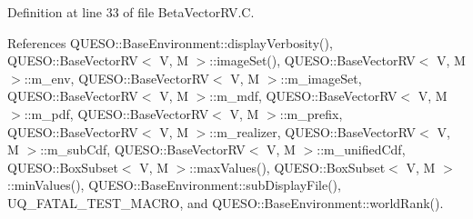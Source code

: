 Definition at line 33 of file Beta\-Vector\-R\-V.\-C.



References Q\-U\-E\-S\-O\-::\-Base\-Environment\-::display\-Verbosity(), Q\-U\-E\-S\-O\-::\-Base\-Vector\-R\-V$<$ V, M $>$\-::image\-Set(), Q\-U\-E\-S\-O\-::\-Base\-Vector\-R\-V$<$ V, M $>$\-::m\-\_\-env, Q\-U\-E\-S\-O\-::\-Base\-Vector\-R\-V$<$ V, M $>$\-::m\-\_\-image\-Set, Q\-U\-E\-S\-O\-::\-Base\-Vector\-R\-V$<$ V, M $>$\-::m\-\_\-mdf, Q\-U\-E\-S\-O\-::\-Base\-Vector\-R\-V$<$ V, M $>$\-::m\-\_\-pdf, Q\-U\-E\-S\-O\-::\-Base\-Vector\-R\-V$<$ V, M $>$\-::m\-\_\-prefix, Q\-U\-E\-S\-O\-::\-Base\-Vector\-R\-V$<$ V, M $>$\-::m\-\_\-realizer, Q\-U\-E\-S\-O\-::\-Base\-Vector\-R\-V$<$ V, M $>$\-::m\-\_\-sub\-Cdf, Q\-U\-E\-S\-O\-::\-Base\-Vector\-R\-V$<$ V, M $>$\-::m\-\_\-unified\-Cdf, Q\-U\-E\-S\-O\-::\-Box\-Subset$<$ V, M $>$\-::max\-Values(), Q\-U\-E\-S\-O\-::\-Box\-Subset$<$ V, M $>$\-::min\-Values(), Q\-U\-E\-S\-O\-::\-Base\-Environment\-::sub\-Display\-File(), U\-Q\-\_\-\-F\-A\-T\-A\-L\-\_\-\-T\-E\-S\-T\-\_\-\-M\-A\-C\-R\-O, and Q\-U\-E\-S\-O\-::\-Base\-Environment\-::world\-Rank().


